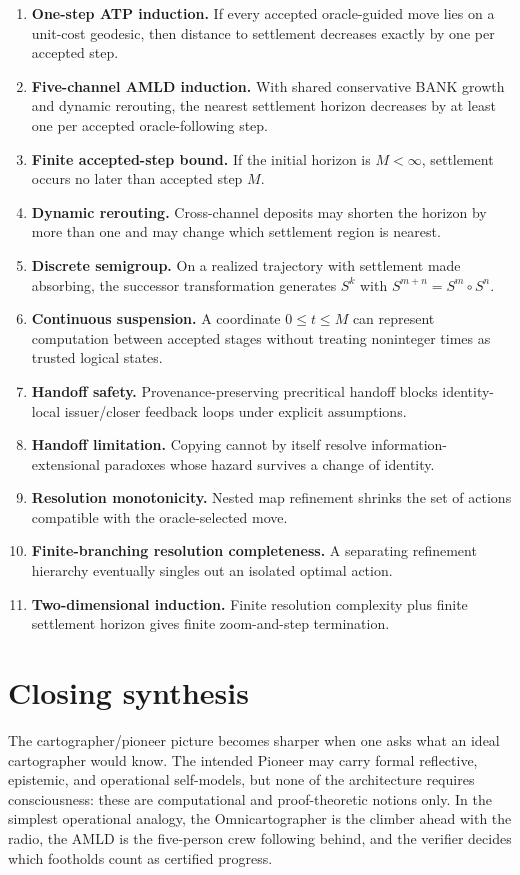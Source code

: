 \documentclass[11pt]{article}
\theoremstyle{remark}
\begin{document}
\begin{enumerate}[label=\textbf{O\arabic*.}]
\item \textbf{One-step ATP induction.} If every accepted oracle-guided move lies on a unit-cost geodesic, then distance to settlement decreases exactly by one per accepted step.
\item \textbf{Five-channel AMLD induction.} With shared conservative BANK growth and dynamic rerouting, the nearest settlement horizon decreases by at least one per accepted oracle-following step.
\item \textbf{Finite accepted-step bound.} If the initial horizon is $M<\infty$, settlement occurs no later than accepted step $M$.
\item \textbf{Dynamic rerouting.} Cross-channel deposits may shorten the horizon by more than one and may change which settlement region is nearest.
\item \textbf{Discrete semigroup.} On a realized trajectory with settlement made absorbing, the successor transformation generates $S^k$ with $S^{m+n}=S^m\circ S^n$.
\item \textbf{Continuous suspension.} A coordinate $0\le t\le M$ can represent computation between accepted stages without treating noninteger times as trusted logical states.
\item \textbf{Handoff safety.} Provenance-preserving precritical handoff blocks identity-local issuer/closer feedback loops under explicit assumptions.
\item \textbf{Handoff limitation.} Copying cannot by itself resolve information-extensional paradoxes whose hazard survives a change of identity.
\item \textbf{Resolution monotonicity.} Nested map refinement shrinks the set of actions compatible with the oracle-selected move.
\item \textbf{Finite-branching resolution completeness.} A separating refinement hierarchy eventually singles out an isolated optimal action.
\item \textbf{Two-dimensional induction.} Finite resolution complexity plus finite settlement horizon gives finite zoom-and-step termination.
\end{enumerate}

\section{Closing synthesis}

The cartographer/pioneer picture becomes sharper when one asks what an ideal cartographer would know. The intended Pioneer may carry formal reflective, epistemic, and operational self-models, but none of the architecture requires consciousness: these are computational and proof-theoretic notions only. In the simplest operational analogy, the Omnicartographer is the climber ahead with the radio, the AMLD is the five-person crew following behind, and the verifier decides which footholds count as certified progress.
\end{document}

